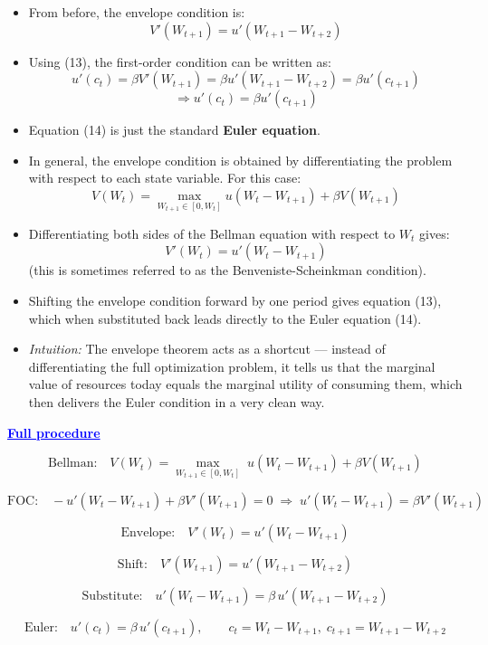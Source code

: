 \documentclass[12pt]{article}
\begin{document}
\begin{itemize}
    \item From before, the envelope condition is:
    \[
    V'(W_{t+1}) = u'(W_{t+1} - W_{t+2}) \tag{13}
    \]

    \item Using (13), the first-order condition can be written as:
    \[
    u'(c_t) = \beta V'(W_{t+1}) = \beta u'(W_{t+1} - W_{t+2}) = \beta u'(c_{t+1})
    \]
    \[
    \Rightarrow u'(c_t) = \beta u'(c_{t+1}) \tag{14}
    \]

    \item Equation (14) is just the standard \textbf{Euler equation}.

    \item In general, the envelope condition is obtained by differentiating the problem with respect to each state variable. For this case:
    \[
    V(W_t) = \max_{W_{t+1} \in [0, W_t]} u(W_t - W_{t+1}) + \beta V(W_{t+1})
    \]

    \item Differentiating both sides of the Bellman equation with respect to \( W_t \) gives:
    \[
    V'(W_t) = u'(W_t - W_{t+1})
    \]
    (this is sometimes referred to as the Benveniste-Scheinkman condition).

    \item Shifting the envelope condition forward by one period gives equation (13), which when substituted back leads directly to the Euler equation (14).

    \item \textit{Intuition:} The envelope theorem acts as a shortcut — instead of differentiating the full optimization problem, it tells us that the marginal value of resources today equals the marginal utility of consuming them, which then delivers the Euler condition in a very clean way.
\end{itemize}

\textcolor{blue}{\textbf{\uline{Full procedure}}}

{\color{blue}
\[
\text{Bellman:}\quad V(W_t)=\max_{W_{t+1}\in[0,W_t]} \; u(W_t-W_{t+1})+\beta V(W_{t+1})
\]

\[
\text{FOC:}\quad -u'(W_t-W_{t+1})+\beta V'(W_{t+1})=0
\;\Rightarrow\;
u'(W_t-W_{t+1})=\beta V'(W_{t+1})
\]

\[
\text{Envelope:}\quad V'(W_t)=u'(W_t-W_{t+1})
\]

\[
\text{Shift:}\quad V'(W_{t+1})=u'(W_{t+1}-W_{t+2})
\]

\[
\text{Substitute:}\quad u'(W_t-W_{t+1})=\beta\,u'(W_{t+1}-W_{t+2})
\]

\[
\text{Euler:}\quad u'(c_t)=\beta\,u'(c_{t+1}),
\qquad c_t=W_t-W_{t+1},\; c_{t+1}=W_{t+1}-W_{t+2}
\]
}
\end{document}
